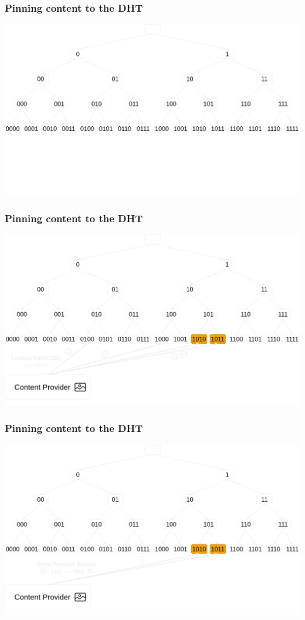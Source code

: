 \documentclass{pl-slide}
\begin{document}
\begin{frame}
\frametitle{Pinning content to the DHT}
\begin{minipage}[b]{\linewidth}
\begin{center}
	\includegraphics[width=.8\linewidth,keepaspectratio]{resources/dht/dht-vanilla.png}
\end{center}
\end{minipage}
\end{frame}

\begin{frame}
\frametitle{Pinning content to the DHT}
\begin{minipage}[b]{\linewidth}
\begin{center}
	\includegraphics[width=.8\linewidth,keepaspectratio]{resources/dht/dht-provider-lookup.png}
\end{center}
\end{minipage}
\end{frame}

\begin{frame}
\frametitle{Pinning content to the DHT}
\begin{minipage}[b]{\linewidth}
\begin{center}
	\includegraphics[width=.8\linewidth,keepaspectratio]{resources/dht/dht-provider-records-publish.png}
\end{center}
\end{minipage}
\end{frame}
\end{document}
